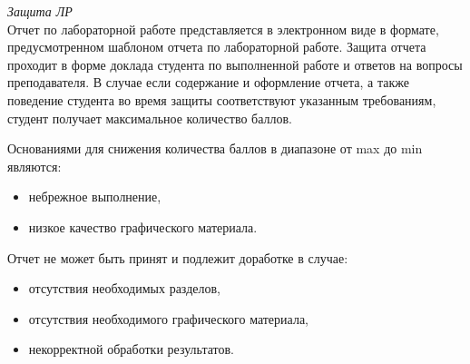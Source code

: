 \noindent\textit{Защита ЛР}\\
Отчет по лабораторной работе представляется в электронном виде в формате, предусмотренном шаблоном отчета по лабораторной работе.
Защита отчета проходит в форме доклада студента по выполненной работе и ответов на вопросы преподавателя.
В случае если содержание и оформление отчета, а также поведение студента во время защиты соответствуют указанным требованиям, студент получает максимальное количество баллов.

Основаниями для снижения количества баллов в диапазоне от max до min являются:
\begin{itemize}
\item небрежное выполнение,
\item низкое качество графического материала.
\end{itemize}

Отчет не может быть принят и подлежит доработке в случае:
\begin{itemize}
\item отсутствия необходимых разделов,
\item отсутствия необходимого графического материала,
\item некорректной обработки результатов.
\end{itemize}
